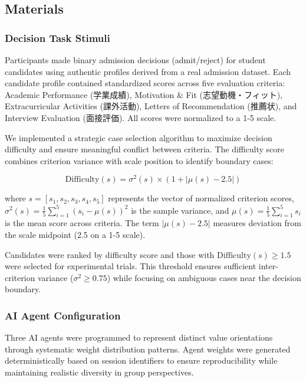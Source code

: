 \documentclass[conference]{IEEEtran}
\begin{document}
\subsection{Materials}

\subsubsection{Decision Task Stimuli}

Participants made binary admission decisions (admit/reject) for student candidates using authentic profiles derived from a real admission dataset. Each candidate profile contained standardized scores across five evaluation criteria: Academic Performance (学業成績), Motivation \& Fit (志望動機・フィット), Extracurricular Activities (課外活動), Letters of Recommendation (推薦状), and Interview Evaluation (面接評価). All scores were normalized to a 1-5 scale.

We implemented a strategic case selection algorithm to maximize decision difficulty and ensure meaningful conflict between criteria. The difficulty score combines criterion variance with scale position to identify boundary cases:

\begin{equation}
\text{Difficulty}(s) = \sigma^2(s) \times (1 + |\mu(s) - 2.5|)
\end{equation}

where $s = [s_1, s_2, s_3, s_4, s_5]$ represents the vector of normalized criterion scores, $\sigma^2(s) = \frac{1}{5}\sum_{i=1}^5 (s_i - \mu(s))^2$ is the sample variance, and $\mu(s) = \frac{1}{5}\sum_{i=1}^5 s_i$ is the mean score across criteria. The term $|\mu(s) - 2.5|$ measures deviation from the scale midpoint (2.5 on a 1-5 scale).

Candidates were ranked by difficulty score and those with $\text{Difficulty}(s) \geq 1.5$ were selected for experimental trials. This threshold ensures sufficient inter-criterion variance ($\sigma^2 \geq 0.75$) while focusing on ambiguous cases near the decision boundary.

\subsubsection{AI Agent Configuration}

Three AI agents were programmed to represent distinct value orientations through systematic weight distribution patterns. Agent weights were generated deterministically based on session identifiers to ensure reproducibility while maintaining realistic diversity in group perspectives.
\end{document}
